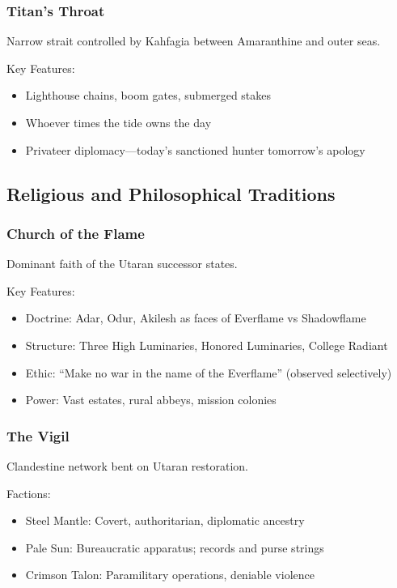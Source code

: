 \subsubsection{Titan's Throat}
\label{sec:titansthroat}

Narrow strait controlled by Kahfagia between Amaranthine and outer seas.

Key Features:
\begin{itemize}
    \item Lighthouse chains, boom gates, submerged stakes
    \item Whoever times the tide owns the day
    \item Privateer diplomacy---today's sanctioned hunter tomorrow's apology
\end{itemize}

\subsection{Religious and Philosophical Traditions}

\subsubsection{Church of the Flame}
\label{sec:churchofflame}

Dominant faith of the Utaran successor states.

Key Features:
\begin{itemize}
    \item Doctrine: Adar, Odur, Akilesh as faces of Everflame vs Shadowflame
    \item Structure: Three High Luminaries, Honored Luminaries, College Radiant
    \item Ethic: ``Make no war in the name of the Everflame'' (observed selectively)
    \item Power: Vast estates, rural abbeys, mission colonies
\end{itemize}

\subsubsection{The Vigil}
\label{sec:thevigil}

Clandestine network bent on Utaran restoration.

Factions:
\begin{itemize}
    \item Steel Mantle: Covert, authoritarian, diplomatic ancestry
    \item Pale Sun: Bureaucratic apparatus; records and purse strings
    \item Crimson Talon: Paramilitary operations, deniable violence
\end{itemize}

